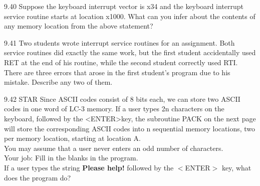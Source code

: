 \documentclass{patt}
\begin{document}
\begin{exercises}
\item[9.40] Suppose the keyboard interrupt vector is x34 and the keyboard
interrupt service routine starts at location x1000. What can you
infer about the contents of any memory location from the above
statement?

\item[9.41] Two students wrote interrupt service routines for an assignment.  Both
service routines did exactly the same work, but the first student
accidentally used RET at the end of his routine, while the second
student correctly used RTI. There are three errors that arose in the
first student's program due to his mistake.  Describe any two of them.

\item[9.42]STAR Since ASCII codes consist of 8 bits each, we can store two ASCII codes in one
word of LC-3 memory.  If a user types 2n characters on the keyboard, followed
by the \textless ENTER\textgreater  key, the subroutine PACK on the next page
will store the corresponding ASCII codes into n sequential memory locations,
two per memory location, starting at location A. \\

\noindent
You may assume that a user never enters an odd number of characters. \\

\noindent
Your job: Fill in the blanks in the program.\\

If a user types the string \textbf{Please help!} followed by the
$<$ENTER$>$ key, what does the program do? \\


\begin{minipage}[t]{0.5\linewidth}
\end{minipage}


\end{exercises}
\end{document}
